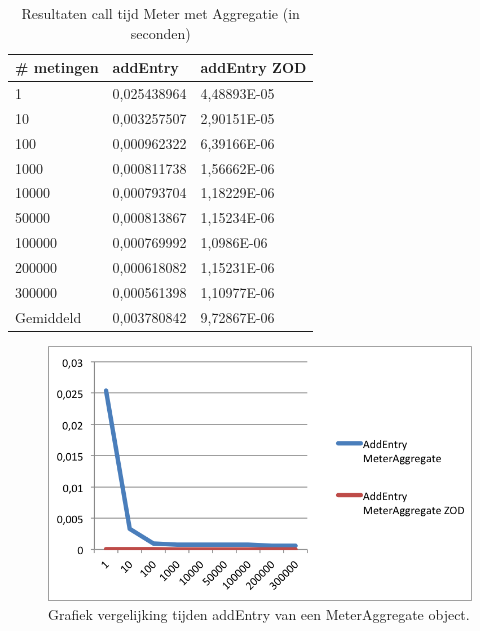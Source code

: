 \begin{table}[]
\centering
\begin{tabular}{|l|l|l|}
\hline
\# metingen & addEntry    & addEntry ZOD \\ \hline
1           & 0,025438964 & 4,48893E-05  \\ \hline
10          & 0,003257507 & 2,90151E-05  \\ \hline
100         & 0,000962322 & 6,39166E-06  \\ \hline
1000        & 0,000811738 & 1,56662E-06  \\ \hline
10000       & 0,000793704 & 1,18229E-06  \\ \hline
50000       & 0,000813867 & 1,15234E-06  \\ \hline
100000      & 0,000769992 & 1,0986E-06   \\ \hline
200000      & 0,000618082 & 1,15231E-06  \\ \hline
300000      & 0,000561398 & 1,10977E-06  \\ \hline
Gemiddeld   & 0,003780842 & 9,72867E-06  \\ \hline
\end{tabular}
\caption{Resultaten call tijd Meter met Aggregatie (in seconden)}
\label{Table:MeterAggregate}
\end{table}

\begin{figure}[!h]
  \centering
  \includegraphics[scale=1.0]{Afbeeldingen/Evaluatie/AddEntryMeterAggregate}
  \caption{Grafiek vergelijking tijden addEntry van een MeterAggregate object.}
  \label{fig:GraphMeterAggregate}
\end{figure}


